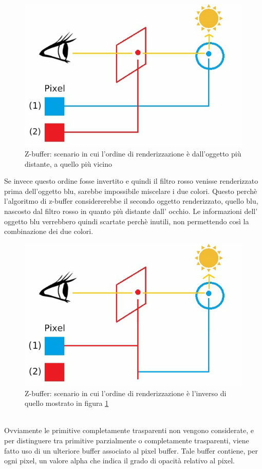 \begin{figure}[htb]
 \centering
 \includegraphics[width=0.7\linewidth]{images/chapter_stato_arte/stato_arte_zbuffer_1.jpg}\hfill
 \caption[Z-buffer: ordine di renderizzazione corretto]{Z-buffer: scenario in cui l'ordine di renderizzazione è dall'oggetto più distante, a quello più vicino}
 \label{fig:stato_arte_zbuffer_1}
\end{figure}
Se invece questo ordine fosse invertito e quindi il filtro rosso venisse renderizzato prima dell’oggetto blu, sarebbe impossibile miscelare i due colori.
Questo perchè l’algoritmo di z-buffer considererebbe il secondo oggetto renderizzato, quello blu, nascosto dal filtro rosso in quanto più distante dall’ occhio. Le informazioni dell’ oggetto blu verrebbero quindi scartate perchè inutili, non permettendo così la combinazione dei due colori.
\\
\begin{figure}[htb]
 \centering
 \includegraphics[width=0.7\linewidth]{images/chapter_stato_arte/stato_arte_zbuffer_2.jpg}\hfill
 \caption[Z-buffer: ordine di renderizzazione errato]{Z-buffer: scenario in cui l'ordine di renderizzazione è l'inverso di quello mostrato in figura \ref{fig:stato_arte_zbuffer_1}}
 \label{fig:stato_arte_zbuffer_2}
\end{figure}
\\
Ovviamente le primitive completamente trasparenti non vengono considerate, e per  distinguere tra primitive parzialmente o completamente trasparenti, viene fatto uso di un ulteriore buffer associato al pixel buffer. Tale buffer contiene, per ogni pixel, un valore alpha che indica il grado di opacità relativo al pixel. 
